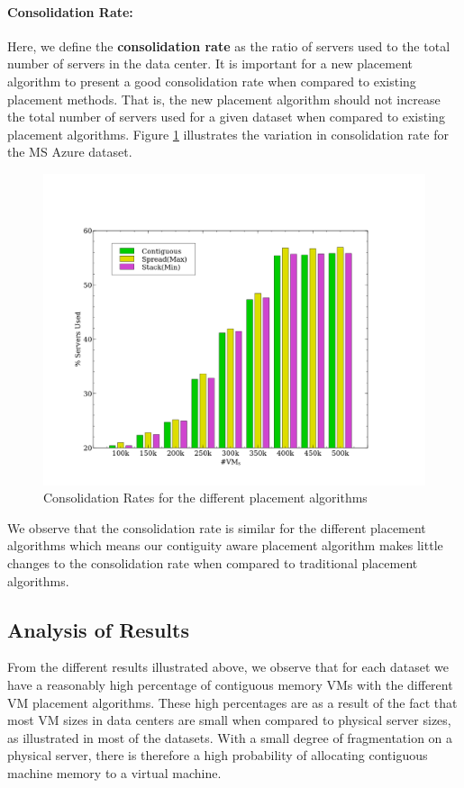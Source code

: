 \documentclass[sigconf]{sigplanconf}
\begin{document}
  \paragraph{Consolidation Rate:} Here, we define the \textbf{consolidation rate} as the ratio of servers used to the total number of servers in the data center. It is important for a new placement algorithm to present a good consolidation rate when compared to existing placement methods. That is, the new placement algorithm should not increase the total number of servers used for a given dataset when compared to existing placement algorithms. Figure \ref{consolidation} illustrates the variation in consolidation rate for the MS Azure dataset.
  \begin{figure}[!h]
  	\centering
  	\includegraphics[scale=0.35]{servers.png}
  	\caption{Consolidation Rates for the different placement algorithms}
  	\label{consolidation}
  \end{figure}
  We observe that the consolidation rate is similar for the different placement algorithms which means our contiguity aware placement algorithm makes little changes to the consolidation rate when compared to traditional placement algorithms.
  \subsection{Analysis of Results}
  From the different results illustrated above, we observe that for each dataset we have a reasonably high percentage of contiguous memory VMs with the different VM placement algorithms. These high percentages are as a result of the fact that most VM sizes in data centers are small when compared to physical server sizes, as illustrated in most of the datasets. With a small degree of fragmentation on a physical server, there is therefore a high probability of allocating contiguous machine memory to a virtual machine. 
  
\end{document}

